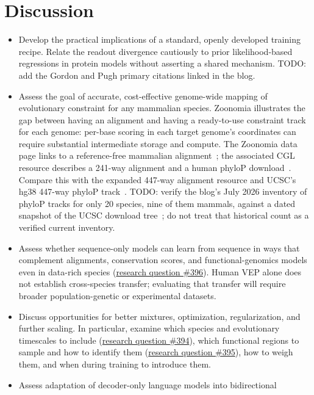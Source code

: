 \documentclass[a4paper,num-refs]{oup-contemporary}
\begin{document}
\section{Discussion}
\begin{itemize}

\item Develop the practical implications of a standard, openly developed
training recipe. Relate the readout divergence cautiously to prior
likelihood-based regressions in protein models without asserting a shared
mechanism. TODO: add the Gordon and Pugh primary citations linked in the blog.
\item Assess the goal of accurate, cost-effective genome-wide mapping of
evolutionary constraint for any mammalian species. Zoonomia illustrates the gap
between having an alignment and having a ready-to-use constraint track for each
genome: per-base scoring in each target genome's coordinates can require
substantial intermediate storage and compute. The Zoonomia data page links to a
reference-free mammalian alignment~\citep{zoonomiadata}; the associated CGL
resource describes a 241-way alignment and a human phyloP
download~\citep{cgl2020}.
Compare this with the expanded 447-way alignment resource and UCSC's hg38
447-way phyloP track~\citep{cgl2023,phylop447resource}.
TODO: verify the blog's July 2026 inventory of phyloP tracks for only 20
species,
nine of them mammals, against a dated snapshot of the UCSC download
tree~\citep{goldenpathresource}; do not treat that historical count as a
verified
current inventory.
\item Assess whether sequence-only models can learn from sequence in ways that
complement alignments, conservation scores, and functional-genomics models even
in data-rich species
(\href{https://github.com/Open-Athena/marin-dna/issues/396}{research question
\#396}).
Human VEP alone does not establish cross-species transfer; evaluating that
transfer will require broader population-genetic or experimental datasets.
\item Discuss opportunities for better mixtures, optimization, regularization,
and further scaling. In particular, examine which species and evolutionary
timescales to include
(\href{https://github.com/Open-Athena/marin-dna/issues/394}{research question
\#394}),
which functional regions to sample and how to identify them
(\href{https://github.com/Open-Athena/marin-dna/issues/395}{research question
\#395}),
how to weigh them, and when during training to introduce them.
\item Assess adaptation of decoder-only language models into bidirectional

\end{itemize}
\end{document}
